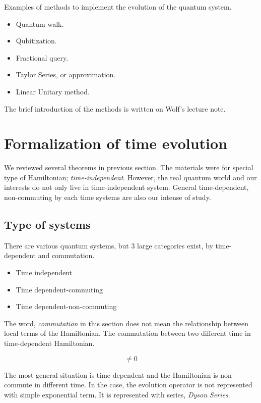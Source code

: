 Examples of methods to implement the evolution of the quantum system.

\begin{itemize}
    \item Quantum walk.
    \item Qubitization.
    \item Fractional query.
    \item Taylor Series, or approximation.
    \item Linear Unitary method.
\end{itemize}

The brief introduction of the methods is written on Wolf's lecture note\cite{de2019quantum}.

\section{Formalization of time evolution}

We reviewed several theorems in previous section.
The materials were for special type of Hamiltonian;
\textit{time-independent}.
However, the real quantum world 
and our interests do not only live in time-independent system.
General time-dependent, non-commuting by each time systems are also 
our intense of study.

\subsection{Type of systems}

There are various quantum systems, but 3 large categories exist, by time-dependent and commutation.

\begin{itemize}
    \item Time independent
    \item Time dependent-commuting
    \item Time dependent-non-commuting
\end{itemize}

The word, \textit{commutation} in this section does not mean 
the relationship between local terms of the Hamiltonian.
The commutation between two different time in time-dependent Hamiltonian.

\begin{equation}
    [H(t_1), H(t_2) ] \neq 0  
\end{equation}


The most general situation is time dependent and the Hamiltonian is non-commute 
in different time.
In the case, the evolution operator is not represented with simple
exponential term. It is represented with series, \textit{Dyson Series}.


